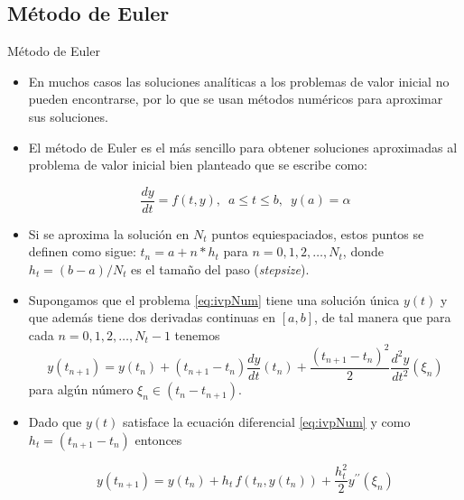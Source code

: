 \documentclass{beamer}
\begin{document}
\subsection{Método de Euler}

\begin{frame}{Método de Euler}

\begin{itemize}
\item En muchos casos las soluciones analíticas a los problemas de valor inicial no pueden encontrarse, por lo que se usan métodos numéricos para aproximar sus soluciones.

\item El método de Euler es el más sencillo para obtener soluciones aproximadas al problema de valor inicial bien planteado que se escribe como:

\begin{equation}\label{eq:ivpNum}
\dfrac{d y}{d t} = f(t,y), \,\,\, a \leq t \leq b, \,\,\, y(a) = \alpha
\end{equation}

\item Si se aproxima la solución en $N_t$ puntos equiespaciados, estos puntos se definen como sigue: $t_n = a + n * h_t$ para $n = 0,1,2, \dots , N_t$, donde $h_t = (b-a)/N_t$ es el tamaño del paso (\textit{stepsize}).
\end{itemize}

\end{frame}

\begin{frame}{}

\begin{itemize}
	\item Supongamos que el problema \eqref{eq:ivpNum} tiene una solución única $y(t)$ y que además tiene dos derivadas continuas en $[a,b]$, de tal manera que para cada $n = 0,1,2, \dots , N_t-1$ tenemos
	\begin{displaymath}
	y(t_{n+1}) = y(t_n) + (t_{n+1} - t_n)  \dfrac{d y}{d t} (t_n) + \dfrac{(t_{n+1} - t_n)^2}{2} \dfrac{d^2 y}{d t^2} (\xi_n)
	\end{displaymath}
	para algún número $\xi_n \in (t_n - t_{n+1})$.	
	\item Dado que $y(t)$ satisface la ecuación diferencial \eqref{eq:ivpNum} y como $h_t = (t_{n+1} - t_n) $ entonces
	
	\begin{equation}\label{eq:Euler01}
	y(t_{n+1}) = y(t_n) + h_t  \, f(t_n, y(t_n)) + \dfrac{h_t^2}{2} y^{\prime \prime} (\xi_n)
	\end{equation}
\end{itemize}
\end{frame}
\end{document}
